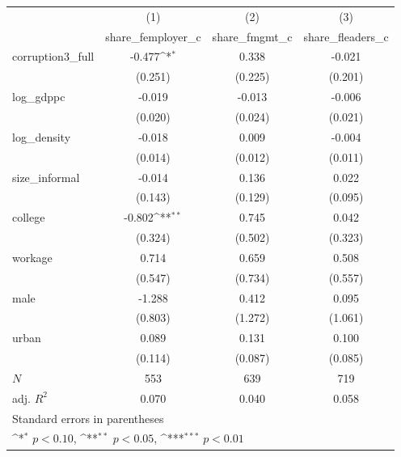 {
\def\sym#1{\ifmmode^{#1}\else\(^{#1}\)\fi}
\begin{tabular}{l*{3}{c}}
\hline\hline
            &\multicolumn{1}{c}{(1)}&\multicolumn{1}{c}{(2)}&\multicolumn{1}{c}{(3)}\\
            &\multicolumn{1}{c}{share\_femployer\_c}&\multicolumn{1}{c}{share\_fmgmt\_c}&\multicolumn{1}{c}{share\_fleaders\_c}\\
\hline
corruption3\_full&      -0.477\sym{*}  &       0.338         &      -0.021         \\
            &     (0.251)         &     (0.225)         &     (0.201)         \\
[1em]
log\_gdppc   &      -0.019         &      -0.013         &      -0.006         \\
            &     (0.020)         &     (0.024)         &     (0.021)         \\
[1em]
log\_density &      -0.018         &       0.009         &      -0.004         \\
            &     (0.014)         &     (0.012)         &     (0.011)         \\
[1em]
size\_informal&      -0.014         &       0.136         &       0.022         \\
            &     (0.143)         &     (0.129)         &     (0.095)         \\
[1em]
college     &      -0.802\sym{**} &       0.745         &       0.042         \\
            &     (0.324)         &     (0.502)         &     (0.323)         \\
[1em]
workage     &       0.714         &       0.659         &       0.508         \\
            &     (0.547)         &     (0.734)         &     (0.557)         \\
[1em]
male        &      -1.288         &       0.412         &       0.095         \\
            &     (0.803)         &     (1.272)         &     (1.061)         \\
[1em]
urban       &       0.089         &       0.131         &       0.100         \\
            &     (0.114)         &     (0.087)         &     (0.085)         \\
\hline
\(N\)       &         553         &         639         &         719         \\
adj. \(R^{2}\)&       0.070         &       0.040         &       0.058         \\
\hline\hline
\multicolumn{4}{l}{\footnotesize Standard errors in parentheses}\\
\multicolumn{4}{l}{\footnotesize \sym{*} \(p<0.10\), \sym{**} \(p<0.05\), \sym{***} \(p<0.01\)}\\
\end{tabular}
}
